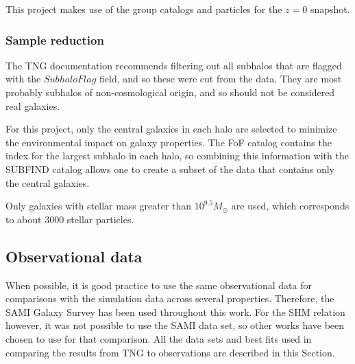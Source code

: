 This project makes use of the group catalogs and particles for the $z=0$ snapshot.

\subsubsection{Sample reduction}

The TNG documentation recommends filtering out all subhalos that are flagged with the $SubhaloFlag$ field, and so these were cut from the data. They are most probably subhalos of non-cosmological origin, and so should not be considered real galaxies.

For this project, only the central galaxies in each halo are selected to minimize the environmental impact on galaxy properties. The FoF catalog contains the index for the largest subhalo in each halo, so combining this information with the SUBFIND catalog allows one to create a subset of the data that contains only the central galaxies.

Only galaxies with stellar mass greater than $10^{9.5} M_{\odot}$ are used, which corresponds to about 3000 stellar particles.

\subsection{Observational data}
When possible, it is good practice to use the same observational data for comparisons with the simulation data across several properties. Therefore, the SAMI Galaxy Survey \parencite{Bryant2015} has been used throughout this work. For the SHM relation however, it was not possible to use the SAMI data set, so other works have been chosen to use for that comparison. All the data sets and best fits used in comparing the results from TNG to observations are described in this Section.

